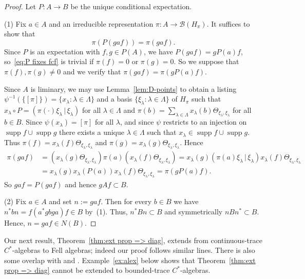 \documentclass[12pt,a4paper]{amsart}
\newcommand{\Bb}{\mathcal{B}}
\newcommand{\supp}{\operatorname{supp}}
\newcommand{\Hh}{{H}}
\begin{document}
\begin{proof}
Let $P : A \to B$ be the unique conditional expectation.

(1) Fix $a \in A$ and an irreducible representation $\pi : A
\to \Bb(\Hh_\pi)$.  It suffices to show that
\begin{equation}\label{eq:P fixes fcf}
\pi(P(gaf)) = \pi(gaf).
\end{equation}
Since $P$ is an expectation with $f, g\in P(A)$, we have
$P(gaf) = g P(a) f$, so~\eqref{eq:P fixes fcf} is trivial if
$\pi(f) = 0$ or $\pi(g)=0$. So we suppose that
$\pi(f),\pi(g) \not= 0$ and we verify that $\pi(gaf) = \pi(
gP(a) f)$.

Since $A$ is liminary, we may use Lemma~\ref{lem:D-points} to
obtain a listing $\psi^{-1}(\{[\pi]\}) = \{x_\lambda : \lambda
\in \Lambda\}$ and a basis $\{\xi_\lambda : \lambda \in
\Lambda\}$ of $\Hh_\pi$ such that $x_\lambda\circ P =
(\pi(\cdot)\xi_\lambda\,|\,\xi_\lambda)$ for all $\lambda \in
\Lambda$ and $\pi(b) = \sum_{\lambda \in \Lambda}
x_\lambda(b)\Theta_{\xi_\lambda,\xi_\lambda}$ for all $b \in
B$. Since $\psi(x_\lambda) = [\pi]$ for all $\lambda$, and
since $\psi$ restricts to an injection on $\supp f\cup\supp g$
there exists a unique $\lambda \in \Lambda$ such that
$x_\lambda\in \supp f\cup\supp g$. Thus $\pi(f) = x_\lambda(f)
\Theta_{\xi_\lambda,\xi_\lambda}$ and $\pi(g) = x_\lambda(g)
\Theta_{\xi_\lambda,\xi_\lambda}$. Hence
\begin{align*}
\pi(gaf)
    &=  (x_\lambda(g) \Theta_{\xi_\lambda,\xi_\lambda}) \pi(a)
            (x_\lambda(f) \Theta_{\xi_\lambda,\xi_\lambda})
    =  x_\lambda(g) (\pi(a)\xi_\lambda\,|\,\xi_\lambda)
        x_\lambda(f)\Theta_{\xi_\lambda,\xi_\lambda} \\
    &=  x_\lambda(g) x_\lambda(P(a))x_\lambda(f) \Theta_{\xi_\lambda,\xi_\lambda}
    = \pi(gP(a)f).
\end{align*}
So $gaf=P(gaf)$ and hence $gAf \subset B$.

\smallskip

(2)  Fix $a \in A$ and set $n := gaf$.  Then for every $b \in
B$ we have $n^*bn = f(a^*gbga)f \in B$ by~(1). Thus, $n^*Bn
\subset B$ and symmetrically  $nBn^* \subset B$.  %
Hence,  $n = gaf \in N(B)$.
\end{proof}


Our next result, Theorem~\ref{thm:ext prop => diag}, extends
\cite[Theorem 2.2]{Kumjian1985} from continuous-trace
$C^*$-algebras to Fell algebras;  indeed our proof follows
similar lines. There is also some overlap with
\cite[Proposition~3.3]{A} and \cite[Proposition~4.1]{BC}.
Example~\ref{ex:alex} below shows that Theorem~\ref{thm:ext
prop => diag} cannot be extended to bounded-trace
$C^*$-algebras.
\end{document}
